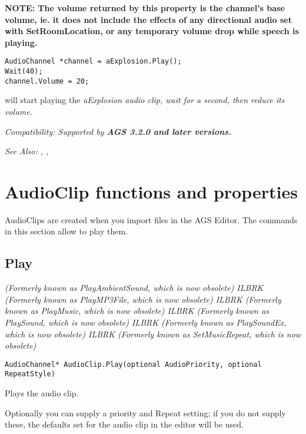 \bf{NOTE:} The volume returned by this property is the channel's base volume, ie. it does
not include the effects of any directional audio set with SetRoomLocation, or any temporary
volume drop while speech is playing.

\begin{verbatim}
AudioChannel *channel = aExplosion.Play();
Wait(40);
channel.Volume = 20;
\end{verbatim}
will start playing the \it{aExplosion} audio clip, wait for a second, then reduce its volume.

\it{Compatibility:} Supported by \bf{AGS 3.2.0} and later versions.

\it{See Also:} ,
, 


\section{AudioClip functions and properties}\label{AudioClipCommands}%

AudioClips are created when you import files in the AGS Editor. The commands in this
section allow to play them.


\subsection{Play}\label{AudioClip.Play}%

\it{(Formerly known as PlayAmbientSound, which is now obsolete)} ILBRK
\it{(Formerly known as PlayMP3File, which is now obsolete)} ILBRK
\it{(Formerly known as PlayMusic, which is now obsolete)} ILBRK
\it{(Formerly known as PlaySound, which is now obsolete)} ILBRK
\it{(Formerly known as PlaySoundEx, which is now obsolete)} ILBRK
\it{(Formerly known as SetMusicRepeat, which is now obsolete)}

\begin{verbatim}
AudioChannel* AudioClip.Play(optional AudioPriority, optional RepeatStyle)
\end{verbatim}
Plays the audio clip.

Optionally you can supply a priority and Repeat setting; if you do not supply these,
the defaults set for the audio clip in the editor will be used.

